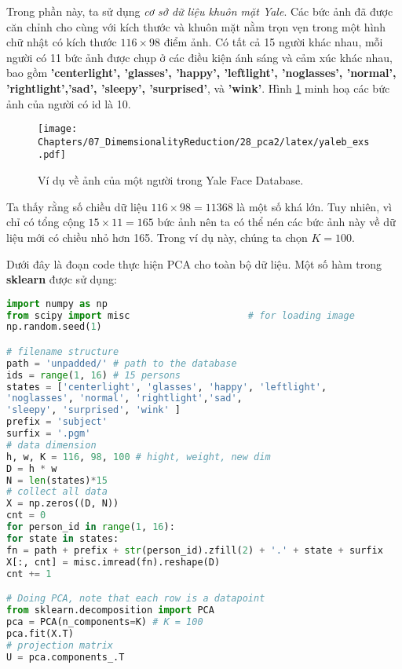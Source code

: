 Trong phần này, ta sử dụng \textit{cơ sở dữ liệu
	khuôn mặt Yale}. Các bức ảnh đã được căn chỉnh cho cùng với kích thước và khuôn mặt nằm trọn vẹn trong
một hình chữ nhật có kích thước $116 \times  98$ điểm ảnh. Có tất cả 15 người khác
nhau, mỗi người có 11 bức ảnh được chụp ở các điều kiện ánh sáng và cảm xúc khác
nhau, bao gồm \textbf{'centerlight', 'glasses', 'happy', 'leftlight',
	'noglasses', 'normal', 'rightlight','sad', 'sleepy', 'surprised'}, và
\textbf{'wink'}. Hình \ref{fig:28_1} minh hoạ các bức ảnh của
người có id là 10.


\begin{figure}[t]
	\centering
	\texttt{[image: Chapters/07\_DimemsionalityReduction/28\_pca2/latex/yaleb\_exs.pdf]}
	\caption{Ví dụ về ảnh của một người trong Yale Face Database.}
	\label{fig:28_1}
\end{figure}
Ta thấy rằng số chiều dữ liệu $116 \times 98 = 11368$ là một số khá
lớn. Tuy nhiên, vì chỉ có tổng cộng $15 \times 11 = 165$ bức ảnh nên ta có thể
nén các bức ảnh này về dữ liệu mới có chiều nhỏ hơn 165. Trong ví dụ này, chúng
ta chọn $K = 100$.

Dưới đây là đoạn code thực hiện PCA cho toàn bộ dữ liệu. Một số hàm trong \textbf{sklearn} được sử dụng:
\newpage
\begin{lstlisting}[language=Python]
import numpy as np
from scipy import misc                     # for loading image
np.random.seed(1)

# filename structure
path = 'unpadded/' # path to the database
ids = range(1, 16) # 15 persons
states = ['centerlight', 'glasses', 'happy', 'leftlight',
'noglasses', 'normal', 'rightlight','sad',
'sleepy', 'surprised', 'wink' ]
prefix = 'subject'
surfix = '.pgm'
# data dimension
h, w, K = 116, 98, 100 # hight, weight, new dim
D = h * w
N = len(states)*15
# collect all data
X = np.zeros((D, N))
cnt = 0
for person_id in range(1, 16):
for state in states:
fn = path + prefix + str(person_id).zfill(2) + '.' + state + surfix
X[:, cnt] = misc.imread(fn).reshape(D)
cnt += 1

# Doing PCA, note that each row is a datapoint
from sklearn.decomposition import PCA
pca = PCA(n_components=K) # K = 100
pca.fit(X.T)
# projection matrix
U = pca.components_.T
\end{lstlisting}


